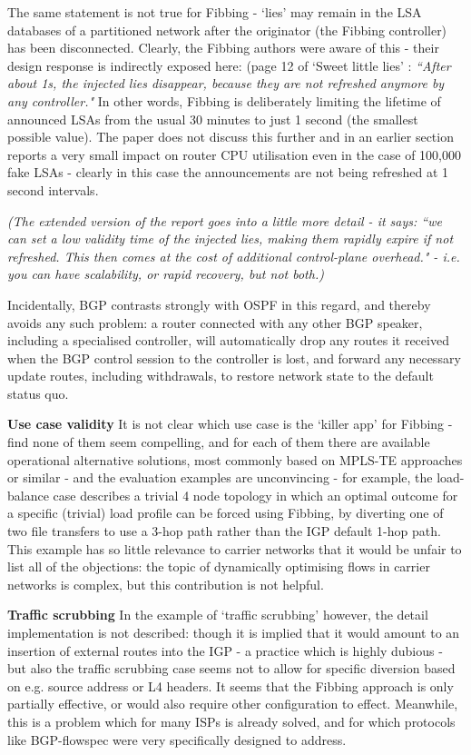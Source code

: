 The same statement is not true for Fibbing - `lies' may remain in the LSA databases of a partitioned network after the originator (the Fibbing controller) has been disconnected.
Clearly, the Fibbing authors were aware of this - their design response is indirectly exposed here: (page 12 of `Sweet little lies' \cite{Vissicchio2014}: \emph{``After about 1s, the injected lies disappear, because they are not refreshed anymore by any controller."}  In other words, Fibbing is deliberately limiting the lifetime of announced LSAs from the usual 30 minutes to just 1 second (the smallest possible value).  The paper does not discuss this further and in an earlier section reports a very small impact on router CPU utilisation even in the case of 100,000 fake LSAs - clearly in this case the announcements are not being refreshed at 1 second intervals.


\emph{(The extended version of the report goes into a little more detail - it says: ``we can set a low validity time of the injected lies, making them rapidly expire if not refreshed. This then comes at the cost of additional control-plane overhead." - i.e. you can have scalability, or rapid recovery, but not both.)}


Incidentally, BGP contrasts strongly with OSPF in this regard, and thereby avoids any such problem: a router connected with any other BGP speaker, including a specialised controller, will automatically drop any routes it received when the BGP control session to the controller is lost, and forward any necessary update routes, including withdrawals, to restore network state to the default status quo.


\textbf{Use case validity}
It is not clear which use case is the `killer app' for Fibbing - find none of them seem compelling, and for each of them there are available operational alternative solutions, most commonly based on MPLS-TE approaches or similar - and the evaluation examples are unconvincing - for example, the load-balance case describes a trivial 4 node topology in which an optimal outcome for a specific (trivial) load profile can be forced using Fibbing, by diverting one of two file transfers to use a 3-hop path rather than the IGP default 1-hop path. This example has so little relevance to carrier networks that it would be unfair to list all of the objections: the topic of dynamically optimising flows in carrier networks is complex, but this contribution is not helpful.


\textbf{Traffic scrubbing} In the example of `traffic scrubbing' however, the detail implementation is not described: though it is implied that it would amount to an insertion of external routes into the IGP - a practice which is highly dubious - but also the traffic scrubbing case seems not to allow for specific diversion based on e.g. source address or L4 headers.  It seems that the Fibbing approach is only partially effective, or would also require other configuration to effect.  Meanwhile, this is a problem which for many ISPs is already solved, and for which protocols like BGP-flowspec were very specifically designed to address.


